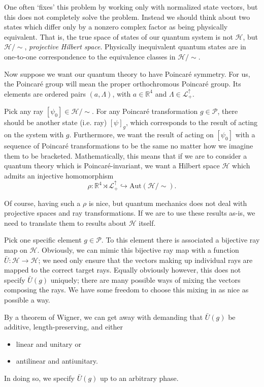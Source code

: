 \documentclass[a4paper]{report}
\newcommand{\R}{\mathbb{R}}
\theoremstyle{definition}
\theoremstyle{plain}
\theoremstyle{remark}
\begin{document}
One often `fixes' this problem by working only with normalized state vectors, but this does not completely solve the problem. Instead we should think about two states which differ only by a nonzero complex factor as being physically equivalent. That is, the true space of states of our quantum system is not $\mathscr{H}$, but $\mathscr{H} / \sim$, \emph{projective Hilbert space}. Physically inequivalent quantum states are in one-to-one correspondence to the equivalence classes in $\mathscr{H}/\sim$.

Now suppose we want our quantum theory to have Poincar{\'e} symmetry. For us, the Poincar{\'e} group will mean the proper orthochromous Poincar{\'e} group. Its elements are ordered pairs $(a, \Lambda)$, with $a \in \R^{4}$ and $\Lambda \in \mathcal{L}^{\uparrow}_{+}$.

Pick any ray $[\psi_{0}] \in \mathscr{H}/\sim$. For any Poincar{\'e} transformation $g \in \mathcal{P}$, there should be another state (i.e. ray) $[\psi]_{g}$, which corresponds to the result of acting on the system with $g$. Furthermore, we want the result of acting on $[\psi_{0}]$ with a sequence of Poincar{\'e} transformations to be the same no matter how we imagine them to be bracketed. Mathematically, this means that if we are to consider a quantum theory which is Poincar{\'e}-invariant, we want a Hilbert space $\mathscr{H}$ which admits an injective homomorphism
\begin{equation*}
  \rho\colon \R^{4} \rtimes \mathcal{L}^{\uparrow}_{+} \hookrightarrow \mathrm{Aut}(\mathscr{H}/\sim).
\end{equation*}

Of course, having such a $\rho$ is nice, but quantum mechanics does not deal with projective spaces and ray transformations. If we are to use these results as-is, we need to translate them to results about $\mathscr{H}$ itself.

Pick one specific element $g \in \mathcal{P}$. To this element there is associated a bijective ray map on $\mathscr{H}$. Obviously, we can mimic this bijective ray map with a function $\bar{U}\colon \mathscr{H} \to \mathscr{H}$; we need only ensure that the vectors making up individual rays are mapped to the correct target rays. Equally obviously however, this does not specify $\bar{U}(g)$ uniquely; there are many possible ways of mixing the vectors composing the rays. We have some freedom to choose this mixing in as nice as possible a way.

By a theorem of Wigner, we can get away with demanding that $\bar{U}(g)$ be additive, length-preserving, and either
\begin{itemize}
  \item linear and unitary or
  \item antilinear and antiunitary.
\end{itemize}
In doing so, we specify $\bar{U}(g)$ up to an arbitrary phase.
\end{document}
